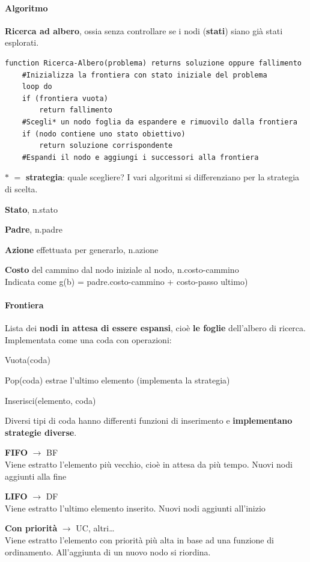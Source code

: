 \documentclass[10pt]{book}
\begin{document}
\paragraph{Algoritmo} \textbf{Ricerca ad albero}, ossia senza controllare se i nodi (\textbf{stati}) siano già stati esplorati.

\begin{lstlisting}
function Ricerca-Albero(problema) returns soluzione oppure fallimento
	#Inizializza la frontiera con stato iniziale del problema
	loop do
	if (frontiera vuota) 
		return fallimento
	#Scegli* un nodo foglia da espandere e rimuovilo dalla frontiera
	if (nodo contiene uno stato obiettivo)
		return soluzione corrispondente
	#Espandi il nodo e aggiungi i successori alla frontiera
\end{lstlisting}
$*$ $=$ \textbf{strategia}: quale scegliere? I vari algoritmi si differenziano per la strategia di scelta.\\
\begin{list}{}{Un \textbf{nodo} n è una \textbf{struttura dati con quattro componenti}}
	\item \textbf{Stato}, n.stato
	\item \textbf{Padre}, n.padre
	\item \textbf{Azione} effettuata per generarlo, n.azione
	\item \textbf{Costo} del cammino dal nodo iniziale al nodo, n.costo-cammino\\
	Indicata come g(b) = padre.costo-cammino + costo-passo ultimo)
\end{list}
\paragraph{Frontiera} Lista dei \textbf{nodi in attesa di essere espansi}, cioè \textbf{le foglie} dell'albero di ricerca. Implementata come una coda con operazioni:
\begin{list}{}{}
	\item Vuota(coda)
	\item Pop(coda) estrae l'ultimo elemento (implementa la strategia)
	\item Inserisci(elemento, coda)
\end{list}
Diversi tipi di coda hanno differenti funzioni di inserimento e \textbf{implementano strategie diverse}.
\begin{list}{}{}
	\item \textbf{FIFO} $\rightarrow$ BF\\
	Viene estratto l'elemento più vecchio, cioè in attesa da più tempo. Nuovi nodi aggiunti alla fine
	\item \textbf{LIFO} $\rightarrow$ DF\\
	Viene estratto l'ultimo elemento inserito. Nuovi nodi aggiunti all'inizio
	\item \textbf{Con priorità} $\rightarrow$ UC, altri\ldots\\
	Viene estratto l'elemento con priorità più alta in base ad una funzione di ordinamento. All'aggiunta di un nuovo nodo si riordina.
\end{list}
\end{document}
